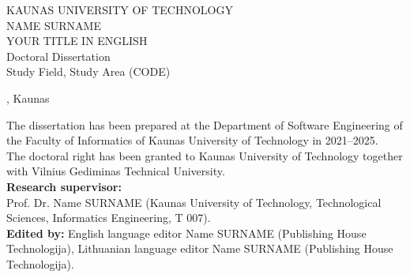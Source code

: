 
\begin{titlepage}
   \begin{center}
   	 


       \MakeUppercase{\Large {Kaunas University of Technology}}\\
       \vspace{5cm}
       \MakeUppercase{\Large Name Surname}\\
       \vspace{2cm}
       \huge
        \expandafter\expandafter\MakeUppercase{Your Title In English}\\
        \large
        \vspace{3cm}
        	{\large Doctoral Dissertation} \\
            {\large {Study Field, Study Area (CODE)}}

       \vfill
       
       
      \large{{\the\year, Kaunas}}
   \end{center}
   \pagebreak
   \thispagestyle{empty}
\noindent The dissertation has been prepared at the Department of Software Engineering of the Faculty of Informatics of Kaunas University of Technology in 2021–2025.\\

\noindent The doctoral right has been granted to Kaunas University of Technology together with Vilnius Gediminas Technical University.\\

\noindent \textbf{Research supervisor:}\\
Prof. Dr. Name SURNAME (Kaunas University of Technology, Technological Sciences, Informatics Engineering, T 007).\\

\noindent \textbf{Edited by:} English language editor Name SURNAME (Publishing House Technologija), Lithuanian language editor Name SURNAME (Publishing House Technologija).\\


\end{titlepage}
